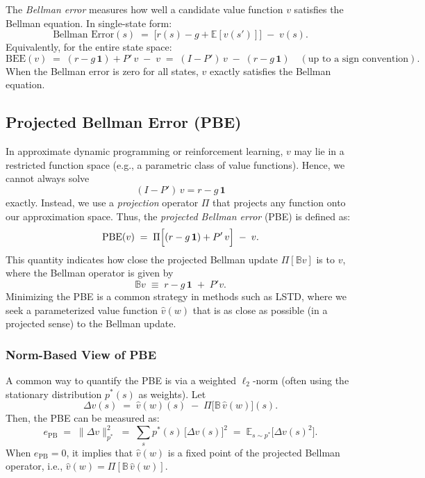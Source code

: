 The \emph{Bellman error} measures how well a candidate value function $v$ satisfies the Bellman equation. In single-state form:
\[
\text{Bellman Error}(s) 
\;=\; \bigl[r(s) - g + \mathbb{E}[v(s')] \bigr] \;-\; v(s).
\]
Equivalently, for the entire state space:
\[
\text{BEE}(v) 
\;=\; (r - g\,\mathbf{1}) + P'\,v \;-\; v
\;=\; (I - P')\,v \;-\; (r - g\,\mathbf{1}) \quad (\text{up to a sign convention}).
\]
When the Bellman error is zero for all states, $v$ exactly satisfies the Bellman equation.

\subsection{Projected Bellman Error (PBE)}
\label{subsec:pbe_definition}

In approximate dynamic programming or reinforcement learning, $v$ may lie in a restricted function space (e.g., a parametric class of value functions). Hence, we cannot always solve 
\[
(I - P')\,v = r - g\,\mathbf{1}
\]
exactly. Instead, we use a \emph{projection} operator $\Pi$ that projects any function onto our approximation space. Thus, the \emph{projected Bellman error} (PBE) is defined as:
\[
\text{PBE}(v) 
\;=\; \Pi\Bigl[ (r - g\,\mathbf{1}) + P'\,v \Bigr] \;-\; v.
\]
This quantity indicates how close the projected Bellman update $\Pi[\mathbb{B}v]$ is to $v$, where the Bellman operator is given by
\[
\mathbb{B}v \;\equiv\; r - g\,\mathbf{1} \;+\; P' v.
\]
Minimizing the PBE is a common strategy in methods such as LSTD, where we seek a parameterized value function $\hat{v}(w)$ that is as close as possible (in a projected sense) to the Bellman update.

\subsubsection{Norm-Based View of PBE}
A common way to quantify the PBE is via a weighted $\ell_2$-norm (often using the stationary distribution $p^*(s)$ as weights). Let
\[
\Delta v(s) \;=\; \hat{v}(w)(s) \;-\; \Pi\bigl[\mathbb{B}\,\hat{v}(w)\bigr](s).
\]
Then, the PBE can be measured as:
\[
e_{\mathrm{PB}}
\;=\;
\bigl\lVert \Delta v \bigr\rVert_{p^*}^2
\;=\;
\sum_{s} p^*(s)\,\bigl[\Delta v(s)\bigr]^2
\;=\;
\mathbb{E}_{s \sim p^*}\bigl[\Delta v(s)^2\bigr].
\]
When $e_{\mathrm{PB}} = 0$, it implies that $\hat{v}(w)$ is a fixed point of the projected Bellman operator, i.e., $\hat{v}(w) = \Pi[\mathbb{B}\,\hat{v}(w)]$.


